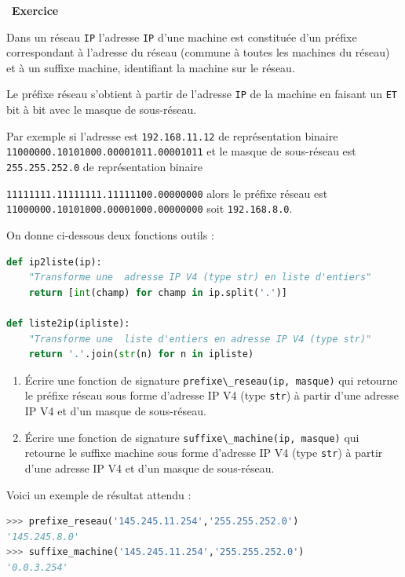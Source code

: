 \documentclass[
  11pt,
]{article}
\newcommand{\passthrough}[1]{#1}
\newcounter{exo}
\newenvironment{exercice}[1]
{\par \medskip   \addtocounter{exo}{1} \noindent  
\begin{bclogo}[arrondi =0.1,   noborder = true, logo=\bccrayon, marge=4]{~\textbf{Exercice} \textbf{\theexo} {\itshape #1} }  \par}
{
\end{bclogo}
 \par \bigskip }
\newcounter{def}
\begin{document}
\begin{exercice}{}

Dans un réseau \passthrough{\lstinline!IP!} l'adresse
\passthrough{\lstinline!IP!} d'une machine est constituée d'un préfixe
correspondant à l'adresse du réseau (commune à toutes les machines du
réseau) et à un suffixe machine, identifiant la machine sur le réseau.

Le préfixe réseau s'obtient à partir de l'adresse
\passthrough{\lstinline!IP!} de la machine en faisant un
\passthrough{\lstinline!ET!} bit à bit avec le masque de sous-réseau.

Par exemple si l'adresse est \passthrough{\lstinline!192.168.11.12!} de
représentation binaire
\passthrough{\lstinline!11000000.10101000.00001011.00001011!} et le
masque de sous-réseau est \passthrough{\lstinline!255.255.252.0!} de
représentation binaire

\passthrough{\lstinline!11111111.11111111.11111100.00000000!} alors le
préfixe réseau est
\passthrough{\lstinline!11000000.10101000.00001000.00000000!} soit
\passthrough{\lstinline!192.168.8.0!}.

On donne ci-dessous deux fonctions outils :

\begin{lstlisting}[language=Python]
def ip2liste(ip):
    "Transforme une  adresse IP V4 (type str) en liste d'entiers"
    return [int(champ) for champ in ip.split('.')]

def liste2ip(ipliste):
    "Transforme une  liste d'entiers en adresse IP V4 (type str)"
    return '.'.join(str(n) for n in ipliste)
\end{lstlisting}

\begin{enumerate}
\def\labelenumi{\arabic{enumi}.}
\item
  Écrire une fonction de signature
  \passthrough{\lstinline!prefixe\_reseau(ip, masque)!} qui retourne le
  préfixe réseau sous forme d'adresse IP V4 (type
  \passthrough{\lstinline!str!}) à partir d'une adresse IP V4 et d'un
  masque de sous-réseau.
\item
  Écrire une fonction de signature
  \passthrough{\lstinline!suffixe\_machine(ip, masque)!} qui retourne le
  suffixe machine sous forme d'adresse IP V4 (type
  \passthrough{\lstinline!str!}) à partir d'une adresse IP V4 et d'un
  masque de sous-réseau.
\end{enumerate}

Voici un exemple de résultat attendu :

\begin{lstlisting}[language=Python]
>>> prefixe_reseau('145.245.11.254','255.255.252.0')
'145.245.8.0'
>>> suffixe_machine('145.245.11.254','255.255.252.0')
'0.0.3.254'
\end{lstlisting}

\end{exercice}
\end{document}
